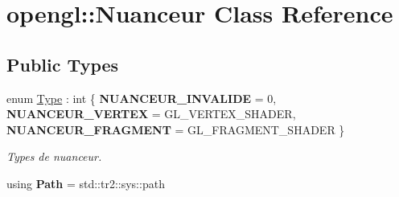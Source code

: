 \hypertarget{classopengl_1_1_nuanceur}{}\section{opengl\+:\+:Nuanceur Class Reference}
\label{classopengl_1_1_nuanceur}
\subsection*{Public Types}
\begin{DoxyCompactItemize}
\item 
\hypertarget{classopengl_1_1_nuanceur_ad2783f2cbd6fb7a5f6dc5032f998c65e}{}enum \hyperlink{classopengl_1_1_nuanceur_ad2783f2cbd6fb7a5f6dc5032f998c65e}{Type} \+: int \{ {\bfseries N\+U\+A\+N\+C\+E\+U\+R\+\_\+\+I\+N\+V\+A\+L\+I\+D\+E} = 0, 
{\bfseries N\+U\+A\+N\+C\+E\+U\+R\+\_\+\+V\+E\+R\+T\+E\+X} = G\+L\+\_\+\+V\+E\+R\+T\+E\+X\+\_\+\+S\+H\+A\+D\+E\+R, 
{\bfseries N\+U\+A\+N\+C\+E\+U\+R\+\_\+\+F\+R\+A\+G\+M\+E\+N\+T} = G\+L\+\_\+\+F\+R\+A\+G\+M\+E\+N\+T\+\_\+\+S\+H\+A\+D\+E\+R
 \}\label{classopengl_1_1_nuanceur_ad2783f2cbd6fb7a5f6dc5032f998c65e}
\begin{DoxyCompactList}\small\item\em Types de nuanceur. \end{DoxyCompactList}
\item 
\hypertarget{classopengl_1_1_nuanceur_aaa72e0922b812cff4d1660810121d5a3}{}using {\bfseries Path} = std\+::tr2\+::sys\+::path\label{classopengl_1_1_nuanceur_aaa72e0922b812cff4d1660810121d5a3}

\end{DoxyCompactItemize}
